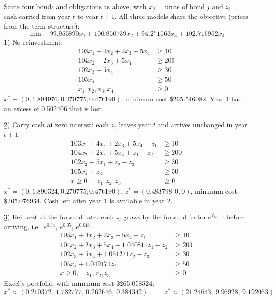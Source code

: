 \begin{example}
    Same four bonds and obligations as above, with $x_j$ = units of bond $j$ and $z_t$ = cash carried from year $t$ to year $t+1$. All three models share the objective (prices from the term structure):
    \[\min \quad 99.955890x_1 + 100.850739x_2 + 94.271563x_3 + 102.710952x_4\]
    \b{1) No reinvestment:}
    \[\begin{aligned}
        103x_1 + 4x_2 + 2x_3 + 5x_4 &\geq 10\\
        104x_2 + 2x_3 + 5x_4 &\geq 200\\
        102x_3 + 5x_4 &\geq 30\\
        105x_4 &\geq 50\\
        x_1, x_2, x_3, x_4 &\geq 0
    \end{aligned}\]
    $x^* = (0, 1.894976, 0.270775, 0.476190)$, minimum cost \$265.546082. Year 1 has an excess of 0.502406 that is lost.

    \b{2) Carry cash at zero interest:} each $z_t$ leaves year $t$ and arrives unchanged in year $t+1$.
    \[\begin{aligned}
        103x_1 + 4x_2 + 2x_3 + 5x_4 - z_1 &\geq 10\\
        104x_2 + 2x_3 + 5x_4 + z_1 - z_2 &\geq 200\\
        102x_3 + 5x_4 + z_2 - z_3 &\geq 30\\
        105x_4 + z_3 &\geq 50\\
        x \geq 0, \quad z_1, z_2, z_3 &\geq 0
    \end{aligned}\]
    $x^* = (0, 1.890324, 0.270775, 0.476190)$, $z^* = (0.483798, 0, 0)$, minimum cost \$265.076934. Cash left after year 1 is available in year 2.

    \b{3) Reinvest at the forward rate:} each $z_t$ grows by the forward factor $e^{f_{t,t+1}}$ before arriving, i.e.\ $e^{0.04}$, $e^{0.05}$, $e^{0.048}$.
    \[\begin{aligned}
        103x_1 + 4x_2 + 2x_3 + 5x_4 - z_1 &\geq 10\\
        104x_2 + 2x_3 + 5x_4 + 1.040811z_1 - z_2 &\geq 200\\
        102x_3 + 5x_4 + 1.051271z_2 - z_3 &\geq 30\\
        105x_4 + 1.049171z_3 &\geq 50\\
        x \geq 0, \quad z_1, z_2, z_3 &\geq 0
    \end{aligned}\]
    Excel's portfolio, with minimum cost \$265.058524:
    \[x^* \approx (0.210372,\ 1.782777,\ 0.262646,\ 0.384342), \qquad z^* \approx (21.24643,\ 9.96928,\ 9.192063)\]


\end{example}
